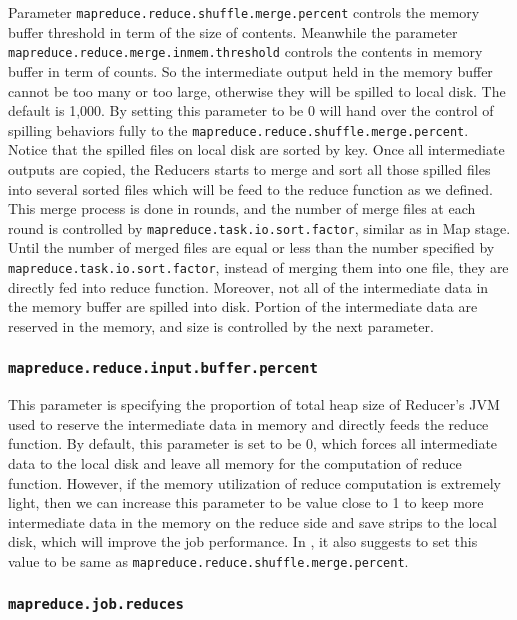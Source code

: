 Parameter \texttt{mapreduce.reduce.shuffle.merge.percent} controls the memory
buffer threshold in term of the size of contents. Meanwhile the parameter \\
\texttt{mapreduce.reduce.merge.inmem.threshold} controls the contents in memory
buffer in term of counts. So the intermediate output held in the memory buffer
cannot be too many or too large, otherwise they will be spilled to local disk.
The default is 1,000. By setting this parameter to be 0 will hand over the control
of spilling behaviors fully to the \texttt{mapreduce.reduce.shuffle.merge.percent}. 
Notice that the spilled files on local disk are sorted by key. Once all 
intermediate outputs are copied, the Reducers starts to merge and sort all those
spilled files into several sorted files which will be feed to the reduce function
as we defined. This merge process is done in rounds, and the number of merge files
at each round is controlled by \texttt{mapreduce.task.io.sort.factor}, similar 
as in Map stage. Until the number of merged files are equal or less than the number 
specified by \\ \texttt{mapreduce.task.io.sort.factor}, instead of merging them 
into one file, they are directly fed into reduce function. Moreover, not all
of the intermediate data in the memory buffer are spilled into disk. Portion of 
the intermediate data are reserved in the memory, and size is controlled by the
next parameter.

\subsubsection{\texttt{mapreduce.reduce.input.buffer.percent}}

This parameter is specifying the proportion of total heap size of Reducer's JVM
used to reserve the intermediate data in memory and directly feeds the reduce
function. By default, this parameter is set to be 0, which forces all intermediate
data to the local disk and leave all memory for the computation of reduce function.
However, if the memory utilization of reduce computation is extremely light, then
we can increase this parameter to be value close to 1 to keep more intermediate
data in the memory on the reduce side and save strips to the local disk, which
will improve the job performance. In \cite{li2014mronline}, it also suggests to
set this value to be same as \texttt{mapreduce.reduce.shuffle.merge.percent}. 

\subsubsection{\texttt{mapreduce.job.reduces}}

